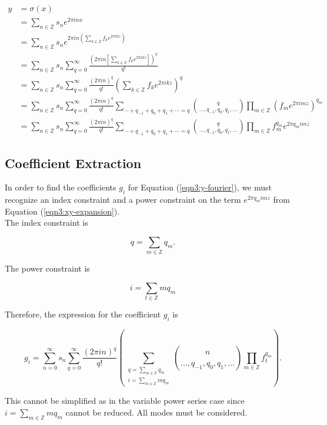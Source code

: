 \documentclass{article}
\begin{document}
    \begin{align}
        y &= \sigma(x) \nonumber \\
        &= \sum_{n \in \mathbb{Z}} s_n e^{2 \pi i n x} \nonumber \\
        &= \sum_{n \in \mathbb{Z}} s_n e^{2 \pi i n \left(\sum_{k \in \mathbb{Z}} f_k e^{2\pi i k z}\right)} \nonumber \\
        &= \sum_{n \in \mathbb{Z}} s_n \sum_{q=0}^{\infty} \frac{\left(2 \pi i n \left[\sum_{k \in \mathbb{Z}} f_k e^{2\pi i k z}\right]\right)^q}{q!} \nonumber \\
        &= \sum_{n \in \mathbb{Z}} s_n \sum_{q=0}^{\infty} \frac{\left(2\pi in\right)^q}{q!} \left(\sum_{k \in \mathbb{Z}} f_k e^{2\pi ikz} \right)^q \nonumber \\
        &= \sum_{n \in \mathbb{Z}} s_n \sum_{q=0}^{\infty} \frac{(2\pi i n)^q}{q!} \sum_{\cdots + q_{-1} + q_{0} + q_{1} + \cdots = q} \binom{q}{\ldots, q_{-1}, q_{0}, q_{1}, \ldots} \prod_{m \in \mathbb{Z}} (f_m e^{2\pi imz})^{q_m} \nonumber \\
        &= \sum_{n \in \mathbb{Z}} s_n \sum_{q=0}^{\infty} \frac{(2\pi i n)^q}{q!} \sum_{\cdots + q_{-1} + q_{0} + q_{1} + \cdots = q} \binom{q}{\ldots, q_{-1}, q_{0}, q_{1}, \ldots} \prod_{m \in \mathbb{Z}} f_m^{q_m} e^{2\pi q_m imz}
        \label{eqn3:xy-expansion}
    \end{align}

    \subsection{Coefficient Extraction}

    In order to find the coefficients $g_i$ for Equation (\ref{eqn3:y-fourier}), we must recognize an index constraint and a power constraint on the term $e^{2\pi q_m imz}$ from Equation (\ref{eqn3:xy-expansion}).\\

    The index constraint is

    \begin{equation}
        q = \sum_{m \in \mathbb{Z}} q_m.
    \end{equation}

    The power constraint is

    \begin{equation}
        i = \sum_{t \in \mathbb{Z}} m q_m
    \end{equation}

    Therefore, the expression for the coefficient $g_i$ is

    \begin{equation}
        g_i = \sum_{n=0}^{\infty} s_n \sum_{q=0}^{\infty} \frac{(2\pi in)^q}{q!} \left(\sum_{\substack{q = \sum_{m \in \mathbb{Z}} q_m \\ i=\sum_{m \in \mathbb{Z}} m q_m}} \binom{n}{\ldots, q_{-1}, q_{0}, q_{1}, \dots} \prod_{m \in \mathbb{Z}}f_t^{q_m} \right).
    \end{equation}

    This cannot be simplified as in the variable power series case since $i = \sum_{m \in \mathbb{Z}} m q_m$ cannot be reduced. All modes must be considered.
\end{document}
